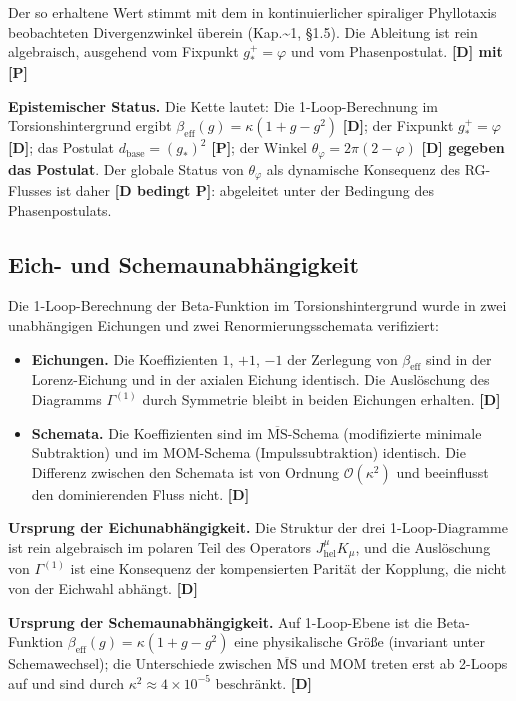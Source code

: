 ﻿\documentclass[11pt,letterpaper]{article}
\begin{document}
Der so erhaltene Wert stimmt mit dem in kontinuierlicher spiraliger Phyllotaxis beobachteten Divergenzwinkel überein (Kap.\textasciitilde{}1, §1.5). Die Ableitung ist rein algebraisch, ausgehend vom Fixpunkt $g_*^+ = \varphi$ und vom Phasenpostulat. \textbf{[D] mit } \textbf{[P]}

\textbf{Epistemischer Status.} Die Kette lautet: Die 1-Loop-Berechnung im Torsionshintergrund ergibt $\beta_{\text{eff}}(g) = \kappa(1 + g - g^2)$ \textbf{[D]}; der Fixpunkt $g_*^+ = \varphi$ \textbf{[D]}; das Postulat $d_{\text{base}} = (g_*)^2$ \textbf{[P]}; der Winkel $\theta_\varphi = 2\pi(2 - \varphi)$ \textbf{[D] gegeben das Postulat}. Der globale Status von $\theta_\varphi$ als dynamische Konsequenz des RG-Flusses ist daher \textbf{[D bedingt P]}: abgeleitet unter der Bedingung des Phasenpostulats.
\subsection{Eich- und Schemaunabhängigkeit}
Die 1-Loop-Berechnung der Beta-Funktion im Torsionshintergrund wurde in zwei unabhängigen Eichungen und zwei Renormierungsschemata verifiziert:

\begin{itemize}[leftmargin=*]
\item \textbf{Eichungen.} Die Koeffizienten $1$, $+1$, $-1$ der Zerlegung von $\beta_{\text{eff}}$ sind in der Lorenz-Eichung und in der axialen Eichung identisch. Die Auslöschung des Diagramms $\Gamma^{(1)}$ durch Symmetrie bleibt in beiden Eichungen erhalten. \textbf{[D]}
\item \textbf{Schemata.} Die Koeffizienten sind im $\overline{\text{MS}}$-Schema (modifizierte minimale Subtraktion) und im MOM-Schema (Impulssubtraktion) identisch. Die Differenz zwischen den Schemata ist von Ordnung $\mathcal{O}(\kappa^2)$ und beeinflusst den dominierenden Fluss nicht. \textbf{[D]}
\end{itemize}

\textbf{Ursprung der Eichunabhängigkeit.} Die Struktur der drei 1-Loop-Diagramme ist rein algebraisch im polaren Teil des Operators $J_{\text{hel}}^\mu K_\mu$, und die Auslöschung von $\Gamma^{(1)}$ ist eine Konsequenz der kompensierten Parität der Kopplung, die nicht von der Eichwahl abhängt. \textbf{[D]}

\textbf{Ursprung der Schemaunabhängigkeit.} Auf 1-Loop-Ebene ist die Beta-Funktion $\beta_{\text{eff}}(g) = \kappa(1 + g - g^2)$ eine physikalische Größe (invariant unter Schemawechsel); die Unterschiede zwischen $\overline{\text{MS}}$ und MOM treten erst ab 2-Loops auf und sind durch $\kappa^2 \approx 4 \times 10^{-5}$ beschränkt. \textbf{[D]}
\end{document}
